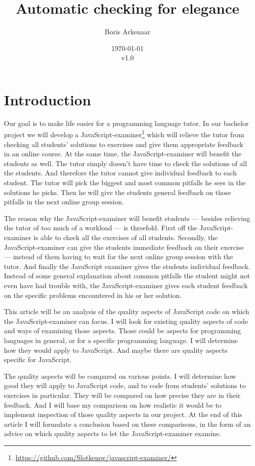 \documentclass{article}
\begin{document}
 

\title{Automatic checking for elegance}
\author{Boris Arkenaar}
\date{\today\\v1.0}
\maketitle 

\section{Introduction} 

Our goal is to make life easier for a programming language tutor. In our
bachelor project we will develop a
JavaScript-examiner\footnote{\url{https://github.com/Slotkenov/javascript-examiner/}}
which will relieve the tutor from checking all students' solutions to exercises
and give them appropriate feedback in an online course. At the same time, the
JavaScript-examiner will benefit the students as well. The tutor simply doesn't
have time to check the solutions of all the students. And therefore the tutor
cannot give individual feedback to each student. The tutor will pick the
biggest and most common pitfalls he sees in the solutions he picks. Then he
will give the students general feedback on those pitfalls in the next online
group session.

The reason why the JavaScript-examiner will benefit students --- besides
relieving the tutor of too much of a workload --- is threefold.  First off
the JavaScript-examiner is able to check all the exercises of all
students. Secondly, the JavaScript-examiner can give the students immediate
feedback on their exercise --- instead of them having to wait for the next
online group session with the tutor. And finally the JavaScript examiner
gives the students individual feedback. Instead of some general explanation
about common pitfalls the student might not even have had trouble with, the
JavaScript-examiner gives each student feedback on the specific problems
encountered in his or her solution.

This article will be an analysis of the quality aspects of JavaScript code on
which the JavaScript-examiner can focus. I will look for existing quality
aspects of code and ways of examining those aspects. Those could be aspects for
programming languages in general, or for a specific programming language. I
will determine how they would apply to JavaScript. And maybe there are quality
aspects specific for JavaScript.

The quality aspects will be compared on various points. I will determine how
good they will apply to JavaScript code, and to code from students' solutions
to exercises in particular. They will be compared on how precise they are in
their feedback. And I will base my comparison on how realistic it would be to
implement inspection of those quality aspects in our project. At the end of
this article I will formulate a conclusion based on these comparisons, in the
form of an advice on which quality aspects to let the JavaScript-examiner
examine.
\end{document}
